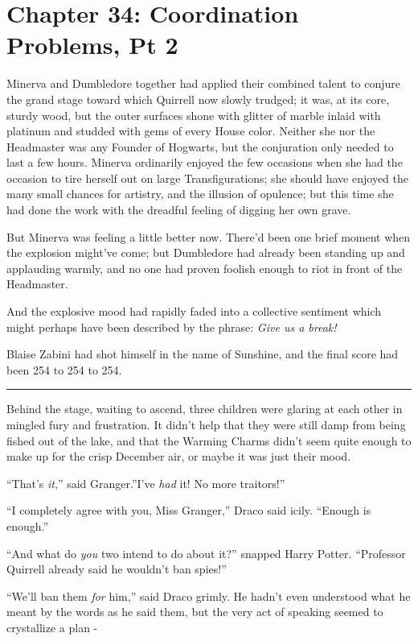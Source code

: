 \chapter{Chapter 34: Coordination Problems, Pt 2}
Minerva and Dumbledore together had applied their combined talent to
conjure the grand stage toward which Quirrell now slowly trudged; it
was, at its core, sturdy wood, but the outer surfaces shone with glitter
of marble inlaid with platinum and studded with gems of every House
color. Neither she nor the Headmaster was any Founder of Hogwarts, but
the conjuration only needed to last a few hours. Minerva ordinarily
enjoyed the few occasions when she had the occasion to tire herself out
on large Transfigurations; she should have enjoyed the many small
chances for artistry, and the illusion of opulence; but this time she
had done the work with the dreadful feeling of digging her own grave.

But Minerva was feeling a little better now. There'd been one brief
moment when the explosion might've come; but Dumbledore had already been
standing up and applauding warmly, and no one had proven foolish enough
to riot in front of the Headmaster.

And the explosive mood had rapidly faded into a collective sentiment
which might perhaps have been described by the phrase: \emph{Give us a
break!}

Blaise Zabini had shot himself in the name of Sunshine, and the final
score had been 254 to 254 to 254.

\begin{center}\rule{3in}{0.4pt}\end{center}

Behind the stage, waiting to ascend, three children were glaring at each
other in mingled fury and frustration. It didn't help that they were
still damp from being fished out of the lake, and that the Warming
Charms didn't seem quite enough to make up for the crisp December air,
or maybe it was just their mood.

``That's \emph{it},'' said Granger.''I've \emph{had} it! No more
traitors!''

``I completely agree with you, Miss Granger,'' Draco said icily.
``Enough is enough.''

``And what do \emph{you} two intend to do about it?'' snapped Harry
Potter. ``Professor Quirrell already said he wouldn't ban spies!''

``We'll ban them \emph{for} him,'' said Draco grimly. He hadn't even
understood what he meant by the words as he said them, but the very act
of speaking seemed to crystallize a plan -

